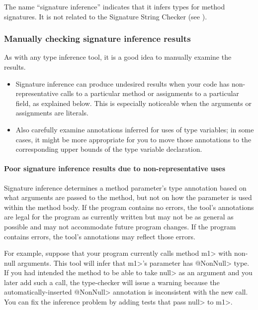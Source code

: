 The name ``signature inference'' indicates that it infers types for method
signatures.  It is not related to the Signature String Checker (see ).


\subsubsection{Manually checking signature inference results\label{signature-inference-manual-checking}}

As with any type inference tool, it is a good idea to manually examine the
results.

\begin{itemize}
\item
Signature inference can produce undesired results when your code has
non-representative calls to a particular method or assignments to a
particular field, as explained below.
This is especially noticeable when the arguments or assignments are literals.

\item
Also carefully examine annotations inferred for uses of type variables; in
some cases, it might be more appropriate for you to move those annotations
to the corresponding upper bounds of the type variable declaration.

\end{itemize}


\paragraph{Poor signature inference results due to non-representative uses}

Signature inference determines a method parameter's type
annotation based on what arguments are passed to the method, but not on how the
parameter is used within the method body.  If the program contains
no errors, the tool's annotations are legal for the program as
currently written but may not be as general as possible and may not
accommodate future program changes.  If the program contains errors, the
tool's annotations may reflect those errors.

For example, suppose that your program currently calls
method \<m1> with non-null
arguments.  This tool will infer that \<m1>'s parameter has
\<@NonNull> type.  If you had intended the method to be able to
take \<null> as an argument and you later add such a call, the type-checker
will issue a warning because the automatically-inserted \<@NonNull>
annotation is inconsistent with the new call.
You can fix the inference problem by adding tests that pass \<null> to \<m1>.

